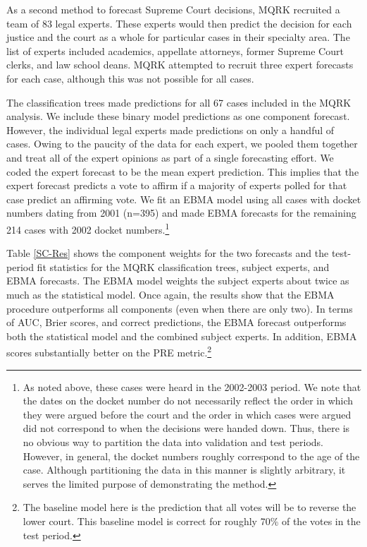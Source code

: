 \documentclass[12pt,fullpage,endnotes]{article}
\newcommand{\note}[1]{\footnote{ #1 \vspace{4 mm}}}
\begin{document}
As a second method to forecast Supreme Court decisions, MQRK recruited
a team of 83 legal experts. These experts would then predict the
decision for each justice and the court as a whole for particular
cases in their specialty area. The list of experts included academics,
appellate attorneys, former Supreme Court clerks, and law school
deans. MQRK attempted to recruit three expert forecasts for each case,
although this was not possible for all cases.

The classification trees made predictions for all 67 cases included in
the MQRK analysis. We include these binary model predictions as one
component forecast. However, the individual legal experts made
predictions on only a handful of cases. Owing to the paucity of the
data for each expert, we pooled them together and treat all of the
expert opinions as part of a single forecasting effort. We coded the
expert forecast to be the mean expert prediction. This implies that
the expert forecast predicts a vote to affirm if a majority of experts
polled for that case predict an affirming vote. We fit an EBMA model
using all cases with docket numbers dating from 2001 (n=395) and made
EBMA forecasts for the remaining 214 cases with 2002 docket
numbers.\note{As noted above, these cases were heard in the
  2002-2003 period.  We note that the dates on the docket number do
  not necessarily reflect the order in which they were argued before
  the court and the order in which cases were argued did not correspond
  to when the decisions were handed down.  Thus, there is no obvious
  way to partition the data into validation and test periods.
  However, in general, the docket numbers roughly correspond to the
  age of the case.  Although partitioning the data in this manner is
  slightly arbitrary, it serves the limited purpose of demonstrating
  the method.}

Table \ref{SC-Res} shows the component weights for the two forecasts
and the test-period fit statistics for the MQRK classification trees,
subject experts, and EBMA forecasts. The EBMA model weights the
subject experts about twice as much as the statistical model. Once
again, the results show that the EBMA procedure outperforms all
components (even when there are only two). In terms of AUC, Brier
scores, and correct predictions, the EBMA forecast outperforms both
the statistical model and the combined subject experts. In addition,
EBMA scores substantially better on the PRE metric.\note{The baseline
  model here is the prediction that all votes will be to reverse the
  lower court. This baseline model is correct for roughly 70\% of the
  votes in the test period.}
  
\end{document}
